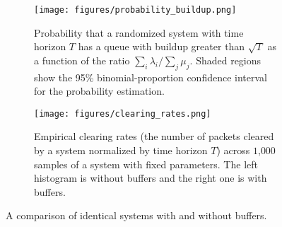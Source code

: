 \begin{figure*}[ht!]
    \centering
    \begin{subfigure}{.44\textwidth}
        \texttt{[image: figures/probability\_buildup.png]} %
        \caption{Probability that a randomized system with time horizon $T$ has a queue with buildup greater than $\sqrt{T}$ as a function of the ratio $\sum_i \lambda_i/\sum_j \mu_j$. Shaded regions show the 95\% binomial-proportion confidence interval for the probability estimation.}
        \label{fig:fig2a-buildup-with-vs-without-buffers}
    \end{subfigure}
    \hfill
    \begin{subfigure}{.44\textwidth}
        \texttt{[image: figures/clearing\_rates.png]} %
        \caption{Empirical clearing rates (the number of packets cleared by a system normalized by time horizon $T$) across $1$,$000$ samples of a system with fixed parameters. The left histogram is without buffers and the right one is with buffers.}
        \label{fig:fig2b-secvice-rate-with-vs-without-buffers}
    \end{subfigure}
    \caption{A comparison of identical systems with and without buffers.}
    \label{fig:fig2-with-vs-without-buffers}
\end{figure*}

